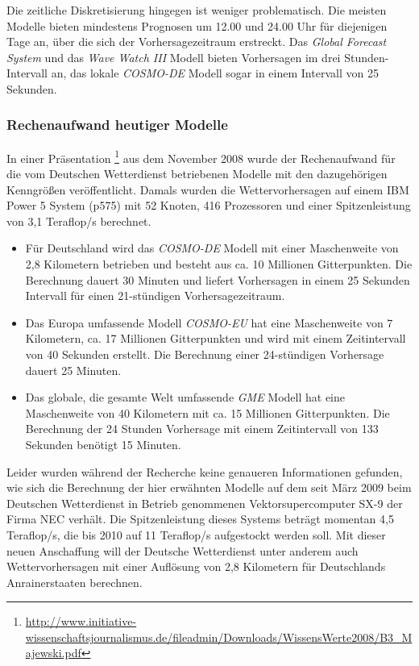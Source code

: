 Die zeitliche Diskretisierung hingegen ist weniger problematisch. Die
meisten Modelle bieten mindestens Prognosen um 12.00 und 24.00 Uhr für
diejenigen Tage an, über die sich der Vorhersagezeitraum
erstreckt. Das \textit{Global Forecast System} und das \textit{Wave
  Watch III} Modell bieten Vorhersagen im drei Stunden-Intervall an,
das lokale \textit{COSMO-DE} Modell sogar in einem Intervall von 25
Sekunden.

\subsubsection{Rechenaufwand heutiger Modelle}

In einer Präsentation
\footnote{\url{http://www.initiative-wissenschaftsjournalismus.de/fileadmin/Downloads/WissensWerte2008/B3_Majewski.pdf}}
aus dem November 2008 wurde der Rechenaufwand für die vom Deutschen
Wetterdienst betriebenen Modelle mit den dazugehörigen Kenngrößen
veröffentlicht. Damals wurden die Wettervorhersagen auf einem IBM
Power 5 System (p575) mit 52 Knoten, 416 Prozessoren und einer
Spitzenleistung von 3,1 Teraflop/s berechnet.

\begin{itemize}
\item Für Deutschland wird das \textit{COSMO-DE} Modell mit einer
  Maschenweite von 2,8 Kilometern betrieben und besteht aus ca. 10
  Millionen Gitterpunkten. Die Berechnung dauert 30 Minuten und
  liefert Vorhersagen in einem 25 Sekunden Intervall für einen
  21-stündigen Vorhersagezeitraum.
\item Das Europa umfassende Modell \textit{COSMO-EU} hat eine
  Maschenweite von 7 Kilometern, ca. 17 Millionen Gitterpunkten und
  wird mit einem Zeitintervall von 40 Sekunden erstellt. Die
  Berechnung einer 24-stündigen Vorhersage dauert 25 Minuten.
\item Das globale, die gesamte Welt umfassende \textit{GME} Modell hat
  eine Maschenweite von 40 Kilometern mit ca. 15 Millionen
  Gitterpunkten. Die Berechnung der 24 Stunden Vorhersage mit einem
  Zeitintervall von 133 Sekunden benötigt 15 Minuten.
\end{itemize}

Leider wurden während der Recherche keine genaueren Informationen
gefunden, wie sich die Berechnung der hier erwähnten Modelle auf dem
seit März 2009 beim Deutschen Wetterdienst in Betrieb genommenen
Vektorsupercomputer SX-9 der Firma NEC verhält. Die Spitzenleistung
dieses Systems beträgt momentan 4,5 Teraflop/s, die bis 2010 auf 11
Teraflop/s aufgestockt werden soll. Mit dieser neuen Anschaffung will
der Deutsche Wetterdienst unter anderem auch Wettervorhersagen mit
einer Auflösung von 2,8 Kilometern für Deutschlands Anrainerstaaten
berechnen.

